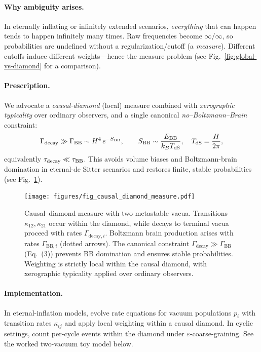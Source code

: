 \documentclass[12pt]{article}
\theoremstyle{remark}
\begin{document}
\paragraph{Why ambiguity arises.} In eternally inflating or infinitely extended scenarios, \emph{everything} that can happen tends to happen infinitely many times. Raw frequencies become $\infty/\infty$, so probabilities are undefined without a regularization/cutoff (a \emph{measure}). Different cutoffs induce different weights---hence the measure problem (see Fig.~\ref{fig:global-vs-diamond} for a comparison).

\paragraph{Prescription.} We advocate a \emph{causal-diamond} (local) measure combined with \emph{xerographic typicality} over ordinary observers, and a single canonical \emph{no--Boltzmann--Brain} constraint:
\begin{equation}
 \Gamma_{\rm decay} \gg \Gamma_{\rm BB} \sim H^4\,e^{-S_{\rm BB}},\qquad 
 S_{\rm BB}\sim \frac{E_{\rm BB}}{k_B T_{\rm dS}},\quad T_{\rm dS}=\frac{H}{2\pi},
\end{equation}
equivalently $\tau_{\rm decay}\ll \tau_{\rm BB}$. This avoids volume biases and Boltzmann-brain domination in eternal-de Sitter scenarios and restores finite, stable probabilities\,\cite{DysonKlebanSusskind2002,Page2007} (see Fig.~\ref{fig:diamond-measure}).

\begin{figure}[t]
  \centering
  \texttt{[image: figures/fig\_causal\_diamond\_measure.pdf]}
  \caption{Causal–diamond measure with two metastable vacua. 
  Transitions $\kappa_{12}, \kappa_{21}$ occur within the diamond, 
  while decays to terminal vacua proceed with rates $\Gamma_{\mathrm{decay},i}$. 
  Boltzmann brain production arises with rates $\Gamma_{\mathrm{BB},i}$ (dotted arrows). 
  The canonical constraint $\Gamma_{\mathrm{decay}} \gg \Gamma_{\mathrm{BB}}$ (Eq.~(3)) 
  prevents BB domination and ensures stable probabilities. 
  Weighting is strictly local within the causal diamond, with xerographic typicality 
  applied over ordinary observers.}
  \label{fig:diamond-measure}
\end{figure}

\paragraph{Implementation.} In eternal-inflation models, evolve rate equations for vacuum populations $p_i$ with transition rates $\kappa_{ij}$ and apply local weighting within a causal diamond. In cyclic settings, count per-cycle events within the diamond under $\varepsilon$-coarse-graining. See the worked two-vacuum toy model below.
\end{document}
